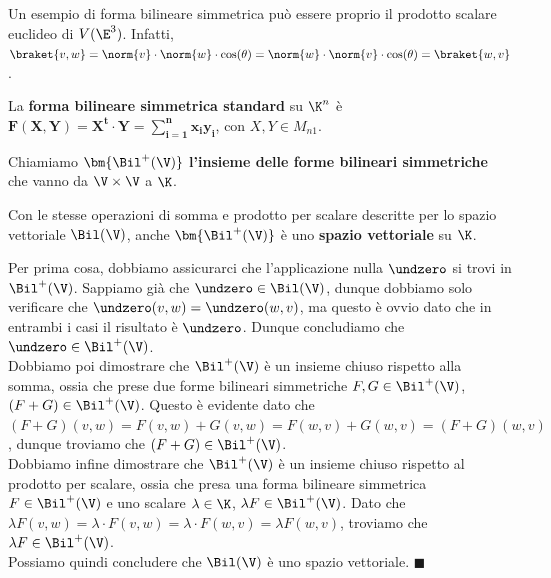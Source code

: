 \documentclass[11pt, a4paper, titlepage, oneside]{scrbook}
\begin{document}
Un esempio di forma bilineare simmetrica può essere proprio il prodotto scalare euclideo di $V(\E^3)$. Infatti, \mbox{$\braket{v,w} = \norm{v} \cdot \norm{w} \cdot \cos(\theta) = \norm{w} \cdot \norm{v} \cdot \cos(\theta) = \braket{w,v}$}. 

\begin{Definizione}
\label{def-forma-bilineare-simmetrica-standard}
La \textbf{forma bilineare simmetrica standard} su $\K^n$ è $\bm{F(X,Y) = X^t \cdot Y  = \sum_{i = 1}^n x_i y_i}$, con $X,Y \in M_{n1}$.
\end{Definizione}

\begin{Definizione}
\label{def-insieme-forme-bilineari-simmetriche}
Chiamiamo $\bm{\Bil^+(\V)}$ \textbf{l'insieme delle forme bilineari simmetriche} che vanno da $\V \times \V$ a $\K$.
\end{Definizione}

\begin{Proposizione}[]
\label{propos-Bil+-spazio-vettoriale}
Con le stesse operazioni di somma e prodotto per scalare descritte per lo spazio vettoriale $\Bil(\V)$, anche $\bm{\Bil^+(\V)}$ è uno \textbf{spazio vettoriale} su $\K$.
\end{Proposizione}

\Dimostrazione \nopagebreak

Per prima cosa, dobbiamo assicurarci che l'applicazione nulla $\undzero$ si trovi in $\Bil^+(\V)$. Sappiamo già che $\undzero \in \Bil(\V)$, dunque dobbiamo solo verificare che $\undzero(v,w) = \undzero(w,v)$, ma questo è ovvio dato che in entrambi i casi il risultato è $\undzero$. Dunque concludiamo che $\undzero \in \Bil^+(\V)$. \\
Dobbiamo poi dimostrare che $\Bil^+(\V)$ è un insieme chiuso rispetto alla somma, ossia che prese due forme bilineari simmetriche $F,G \in \Bil^+(\V)$, $(F+G) \in \Bil^+(\V)$. Questo è evidente dato che $(F+G)(v,w) = F(v,w) + G(v,w) = F(w,v) + G(w,v) = (F+G)(w,v)$, dunque troviamo che $(F+G) \in \Bil^+(\V)$. \\
Dobbiamo infine dimostrare che $\Bil^+(\V)$ è un insieme chiuso rispetto al prodotto per scalare, ossia che presa una forma bilineare simmetrica $F \in \Bil^+(\V)$ e uno scalare $\lambda \in \K$, $\lambda F \in \Bil^+(\V)$. Dato che $\lambda F(v,w) = \lambda \cdot F(v,w) = \lambda \cdot F(w,v) = \lambda F(w,v)$, troviamo che $\lambda F \in \Bil^+(\V)$.\\
Possiamo quindi concludere che $\Bil(\V)$ è uno spazio vettoriale. $\blacksquare$
\end{document}
